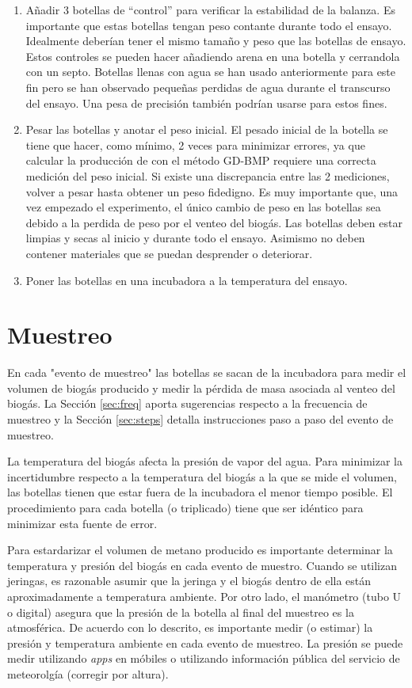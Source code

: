 \documentclass[]{article}
\begin{document}
\begin{enumerate}
     \item Añadir 3 botellas de ``control'' para verificar la estabilidad de la balanza.
      Es importante que estas botellas tengan peso contante durante todo el ensayo. 
      Idealmente deberían tener el mismo tamaño y peso que las botellas de ensayo.
      Estos controles se pueden hacer añadiendo arena en una botella y cerrandola con un septo. 
      Botellas llenas con agua se han usado anteriormente para este fin pero se han observado pequeñas perdidas de agua durante el transcurso del ensayo.
      Una pesa de precisión también podrían usarse para estos fines.
    \item Pesar las botellas y anotar el peso inicial. 
      El pesado inicial de la botella se tiene que hacer, como mínimo, 2 veces para minimizar errores, ya que calcular la producción de  con el método GD-BMP requiere una correcta medición del peso inicial.
      Si existe una discrepancia entre las 2 mediciones, volver a pesar hasta obtener un peso fidedigno.
      Es muy importante que, una vez empezado el experimento, el único cambio de peso en las botellas sea debido a la perdida de peso por el venteo del biogás. Las botellas deben estar limpias y secas al inicio y durante todo el ensayo. Asimismo no deben contener materiales que se puedan desprender o deteriorar.
    \item Poner las botellas en una incubadora a la temperatura del ensayo.
\end{enumerate}

\section{Muestreo}
\label{sec:incsam}
En cada "evento de muestreo" las botellas se sacan de la incubadora para medir el volumen de biogás producido y medir la pérdida de masa asociada al venteo del biogás. La Sección \ref{sec:freq} aporta sugerencias respecto a la frecuencia de muestreo y la Sección \ref{sec:steps} detalla instrucciones paso a paso del evento de muestreo.

La temperatura del biogás afecta la presión de vapor del agua. Para minimizar la incertidumbre respecto a la temperatura del biogás a la que se mide el volumen, las botellas tienen que estar fuera de la incubadora el menor tiempo posible. El procedimiento para cada botella (o triplicado) tiene que ser idéntico para minimizar esta fuente de error.
 

Para estardarizar el volumen de metano producido es importante determinar la temperatura y presión del biogás en cada evento de muestro. Cuando se utilizan jeringas, es razonable asumir que la jeringa y el biogás dentro de ella están aproximadamente a temperatura ambiente. Por otro lado, el manómetro (tubo U o digital) asegura que la presión de la botella al final del muestreo es la atmosférica. De acuerdo con lo descrito, es importante medir (o estimar) la presión y temperatura ambiente en cada evento de muestreo. La presión se puede medir utilizando \textit{apps} en móbiles o utilizando información pública del servicio de meteorolgía (corregir por altura).  
\end{document}
